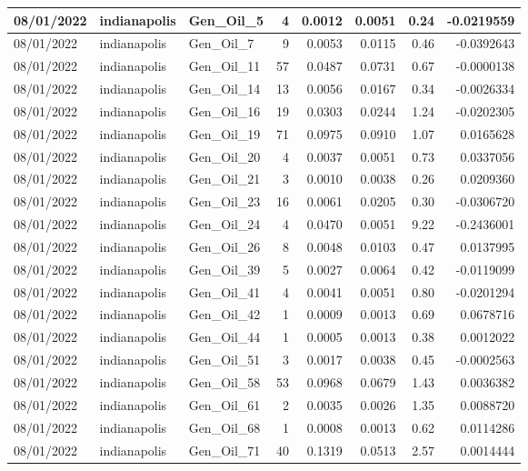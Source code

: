 \documentclass[
  letterpaper,
  DIV=11,
  numbers=noendperiod]{scrartcl}
\begin{document}
\begin{tabular}{l|l|l|r|r|r|r|r}
\hline
08/01/2022 & indianapolis & Gen\_Oil\_5 & 4 & 0.0012 & 0.0051 & 0.24 & -0.0219559\\
\hline
08/01/2022 & indianapolis & Gen\_Oil\_7 & 9 & 0.0053 & 0.0115 & 0.46 & -0.0392643\\
\hline
08/01/2022 & indianapolis & Gen\_Oil\_11 & 57 & 0.0487 & 0.0731 & 0.67 & -0.0000138\\
\hline
08/01/2022 & indianapolis & Gen\_Oil\_14 & 13 & 0.0056 & 0.0167 & 0.34 & -0.0026334\\
\hline
08/01/2022 & indianapolis & Gen\_Oil\_16 & 19 & 0.0303 & 0.0244 & 1.24 & -0.0202305\\
\hline
08/01/2022 & indianapolis & Gen\_Oil\_19 & 71 & 0.0975 & 0.0910 & 1.07 & 0.0165628\\
\hline
08/01/2022 & indianapolis & Gen\_Oil\_20 & 4 & 0.0037 & 0.0051 & 0.73 & 0.0337056\\
\hline
08/01/2022 & indianapolis & Gen\_Oil\_21 & 3 & 0.0010 & 0.0038 & 0.26 & 0.0209360\\
\hline
08/01/2022 & indianapolis & Gen\_Oil\_23 & 16 & 0.0061 & 0.0205 & 0.30 & -0.0306720\\
\hline
08/01/2022 & indianapolis & Gen\_Oil\_24 & 4 & 0.0470 & 0.0051 & 9.22 & -0.2436001\\
\hline
08/01/2022 & indianapolis & Gen\_Oil\_26 & 8 & 0.0048 & 0.0103 & 0.47 & 0.0137995\\
\hline
08/01/2022 & indianapolis & Gen\_Oil\_39 & 5 & 0.0027 & 0.0064 & 0.42 & -0.0119099\\
\hline
08/01/2022 & indianapolis & Gen\_Oil\_41 & 4 & 0.0041 & 0.0051 & 0.80 & -0.0201294\\
\hline
08/01/2022 & indianapolis & Gen\_Oil\_42 & 1 & 0.0009 & 0.0013 & 0.69 & 0.0678716\\
\hline
08/01/2022 & indianapolis & Gen\_Oil\_44 & 1 & 0.0005 & 0.0013 & 0.38 & 0.0012022\\
\hline
08/01/2022 & indianapolis & Gen\_Oil\_51 & 3 & 0.0017 & 0.0038 & 0.45 & -0.0002563\\
\hline
08/01/2022 & indianapolis & Gen\_Oil\_58 & 53 & 0.0968 & 0.0679 & 1.43 & 0.0036382\\
\hline
08/01/2022 & indianapolis & Gen\_Oil\_61 & 2 & 0.0035 & 0.0026 & 1.35 & 0.0088720\\
\hline
08/01/2022 & indianapolis & Gen\_Oil\_68 & 1 & 0.0008 & 0.0013 & 0.62 & 0.0114286\\
\hline
08/01/2022 & indianapolis & Gen\_Oil\_71 & 40 & 0.1319 & 0.0513 & 2.57 & 0.0014444\\

\end{tabular}
\end{document}
